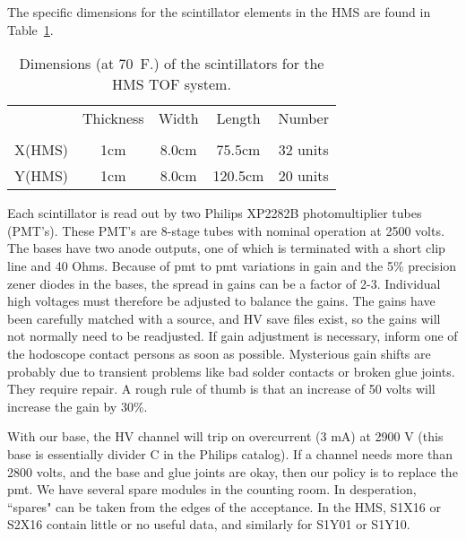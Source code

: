 	The specific dimensions for the scintillator elements in the HMS
are found in Table~\ref{tab:tof_scintillators}.
\begin{table}
\caption{Dimensions (at 70~F.) of the scintillators for the HMS TOF system. 
\label{tab:tof_scintillators}}
\begin{center}
  \begin{tabular}{ccccc}
	&Thickness	&Width		&Length		&Number	\\
	&		&		&		&	\\
\hline
X(HMS)	&	1cm	&	8.0cm	&	75.5cm	&32 units\\
Y(HMS)	&	1cm	&	8.0cm	&	120.5cm	&20 units\\
  \end{tabular}
\end{center}
\end{table}
Each scintillator is read out by two Philips XP2282B photomultiplier
tubes (PMT's). These PMT's are 8-stage tubes with nominal operation at
2500 volts. The bases have two anode outputs, one of which is terminated with a
short clip line and 40 Ohms.  Because of pmt to pmt variations in gain and the
5\% precision zener diodes in the bases, the spread in gains can be a factor of
2-3. Individual high voltages must therefore be adjusted to balance the gains.
The gains have been carefully matched with a source, and HV save files exist,
so the gains will not normally need to be readjusted. If gain adjustment is
necessary, inform one of the hodoscope contact persons as soon as possible.
Mysterious gain shifts are probably due to transient problems like bad solder
contacts or broken glue joints. They require repair. A rough rule of thumb is
that an increase of 50 volts will increase the gain by 30\%.

With our base, the HV channel will trip on overcurrent (3 mA) at 2900 V
(this base is essentially divider C in the Philips catalog). If a channel needs
more than 2800 volts, and the base and glue joints are okay, then our policy
is to replace the pmt. We have several spare modules in the counting room.
In desperation, ``spares" can be taken from the edges of the acceptance. In the
HMS, S1X16 or S2X16 contain little or no useful data, and similarly for S1Y01
or S1Y10.

